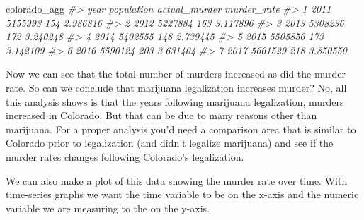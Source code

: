\documentclass[
]{krantz}
\makeatletter
\newenvironment{Shaded}{\begin{snugshade}}{\end{snugshade}}
\newcommand{\AttributeTok}[1]{\textcolor[rgb]{0.61,0.61,0.61}{#1}}
\newcommand{\CommentTok}[1]{\textcolor[rgb]{0.37,0.37,0.37}{\textit{#1}}}
\newcommand{\FloatTok}[1]{\textcolor[rgb]{0.06,0.06,0.06}{#1}}
\newcommand{\FunctionTok}[1]{\textcolor[rgb]{0,0,0}{#1}}
\newcommand{\NormalTok}[1]{#1}
\newcommand{\OtherTok}[1]{\textcolor[rgb]{0.37,0.37,0.37}{#1}}
\newcommand{\SpecialCharTok}[1]{\textcolor[rgb]{0,0,0}{#1}}
\newenvironment{kframe}{%
\medskip{}
\setlength{\fboxsep}{.8em}
 \def\at@end@of@kframe{}%
 \ifinner\ifhmode%
  \def\at@end@of@kframe{\end{minipage}}%
  \begin{minipage}{\columnwidth}%
 \fi\fi%
 \def\FrameCommand##1{\hskip\@totalleftmargin \hskip-\fboxsep
 \colorbox{shadecolor}{##1}\hskip-\fboxsep
     \hskip-\linewidth \hskip-\@totalleftmargin \hskip\columnwidth}%
 \MakeFramed {\advance\hsize-\width
   \@totalleftmargin\z@ \linewidth\hsize
   \@setminipage}}%
 {\par\unskip\endMakeFramed%
 \at@end@of@kframe}
\renewenvironment{Shaded}{\begin{kframe}}{\end{kframe}}
\makeatother
\begin{document}
\begin{Shaded}
\end{Shaded}

\begin{Shaded}
\begin{Highlighting}[]
\NormalTok{colorado\_agg}
\CommentTok{\#\textgreater{}   year population actual\_murder murder\_rate}
\CommentTok{\#\textgreater{} 1 2011    5155993           154    2.986816}
\CommentTok{\#\textgreater{} 2 2012    5227884           163    3.117896}
\CommentTok{\#\textgreater{} 3 2013    5308236           172    3.240248}
\CommentTok{\#\textgreater{} 4 2014    5402555           148    2.739445}
\CommentTok{\#\textgreater{} 5 2015    5505856           173    3.142109}
\CommentTok{\#\textgreater{} 6 2016    5590124           203    3.631404}
\CommentTok{\#\textgreater{} 7 2017    5661529           218    3.850550}
\end{Highlighting}
\end{Shaded}

Now we can see that the total number of murders increased as did the murder rate. So can we conclude that marijuana legalization increases murder? No, all this analysis shows is that the years following marijuana legalization, murders increased in Colorado. But that can be due to many reasons other than marijuana. For a proper analysis you'd need a comparison area that is similar to Colorado prior to legalization (and didn't legalize marijuana) and see if the murder rates changes following Colorado's legalization.

We can also make a plot of this data showing the murder rate over time. With time-series graphs we want the time variable to be on the x-axis and the numeric variable we are measuring to the on the y-axis.

\begin{Shaded}
\end{Shaded}
\end{document}
